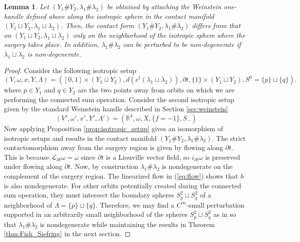 \documentclass{article}
\numberwithin{equation}{section}
\newtheorem{lemma}[theorem]{Lemma}
\theoremstyle{definition}
\newcommand{\R}{\mathbb{R}}
\begin{document}
\begin{lemma}
\label{lem:one_handle}
     Let $(Y_1 \# Y_2, \lambda_1 \# \lambda_2)$ be obtained by attaching the Weinstein one-handle defined above along the isotropic sphere in the contact manifold $(Y_1 \sqcup Y_2, \lambda_1 \sqcup \lambda_2)$. Then, the contact form $(Y_1 \# Y_2, \lambda_1 \# \lambda_2)$ differs from that on $(Y_1 \sqcup Y_2, \lambda_1 \sqcup \lambda_2)$ only on the neighborhood of the isotropic sphere where the surgery takes place. In addition, $\lambda_1 \# \lambda_2$ can be perturbed to be non-degenerate if $\lambda_1 \sqcup \lambda_2$ is non-degenerate.
\end{lemma}
\begin{proof}
    Consider the following isotropic setup 
    $$(V, \omega, x, Y, \Lambda) = ([0,1] \times (Y_1 \sqcup Y_2), d(e^t (\lambda_1 \sqcup \lambda_2)), \partial t,\{1\} \times (Y_1 \sqcup Y_2), S^0 = \{p\}\sqcup\{q\}).$$
    where $p\in Y_1$ and $q\in Y_2$ are the two points away from orbits on which we are performing the connected sum operation.
    Consider the second isotropic setup given by the standard Weinstein handle described in Section \ref{sec:weinstein}
    $$(V', \omega', x', Y', \Lambda') = (\R^4, \omega, X, \{f = -1\}, S_-)$$
    Now applying Proposition \ref{prop:isotropic_setup} gives an isomorphism of isotropic setups and results in the contact manifold $(Y_1 \# Y_2, \lambda_1 \# \lambda_2)$. The strict contactomorphism away from the surgery region is given by flowing along $\partial t$. This is because $\mathcal{L}_{\partial t} \omega = \omega$ since $\partial t$ is a Liouville vector field, so $i_{\partial t} \omega$ is preserved under flowing along $\partial t$. Now, by construction $\lambda_1 \# \lambda_2$ is nondegenerate on the complement of the surgery region. The linearized flow in (\ref{eq:flow}) shows that $h$ is also nondegenerate. For other orbits potentially created during the connected sum operation, they must intersect the boundary spheres $S^2_p\sqcup S^2_q$ of a neighborhood of $\Lambda = \{p\}\sqcup \{q\}$. Therefore, we may find a $C^\infty$-small perturbation supported in an arbitrarily small neighborhood of the spheres $S^2_p\sqcup S^2_q$ as in \cite{Fish_Siefring} so that $\lambda_1 \# \lambda_2$ is nondegenerate while maintaining the results in Theorem \ref{thm:Fish_Siefring} in the next section.
\end{proof}
\end{document}
